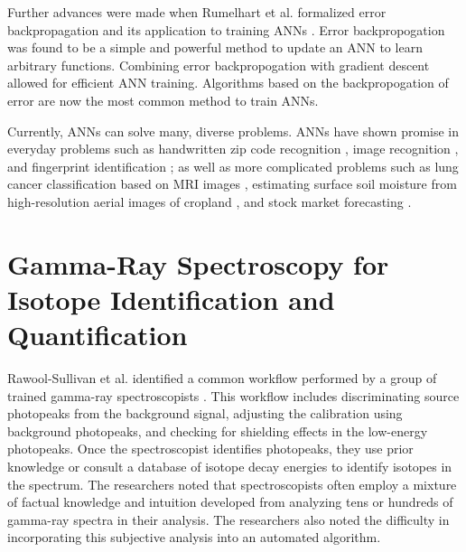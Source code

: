 
Further advances were made when Rumelhart et al. formalized error backpropagation and its application to training ANNs \cite{Rumelhart1986}. Error backpropogation was found to be a simple and powerful method to update an ANN to learn arbitrary functions. Combining error backpropogation with gradient descent allowed for efficient ANN training. Algorithms based on the backpropogation of error are now the most common method to train ANNs. %

Currently, ANNs can solve many, diverse problems. ANNs have shown promise in everyday problems such as handwritten zip code recognition \cite{LeCun1989}, image recognition \cite{Krizhevsky2012}, and fingerprint identification \cite{Jeyanthia2015}; as well as more complicated problems such as lung cancer classification based on MRI images \cite{Selvakumari2016}, estimating surface soil moisture from high-resolution aerial images of cropland \cite{Hassan-Esfahani2015}, and stock market forecasting \cite{Rababaah2015}. 


\section{Gamma-Ray Spectroscopy for Isotope Identification and Quantification}

Rawool-Sullivan et al. identified a common workflow performed by a group of trained gamma-ray spectroscopists \cite{RawoolSullivan2010}. This workflow includes discriminating source photopeaks from the background signal, adjusting the calibration using background photopeaks, and checking for shielding effects in the low-energy photopeaks. Once the spectroscopist identifies photopeaks, they use prior knowledge or consult a database of isotope decay energies to identify isotopes in the spectrum. The researchers noted that spectroscopists often employ a mixture of factual knowledge and intuition developed from analyzing tens or hundreds of gamma-ray spectra in their analysis. The researchers also noted the difficulty in incorporating this subjective analysis into an automated algorithm.

